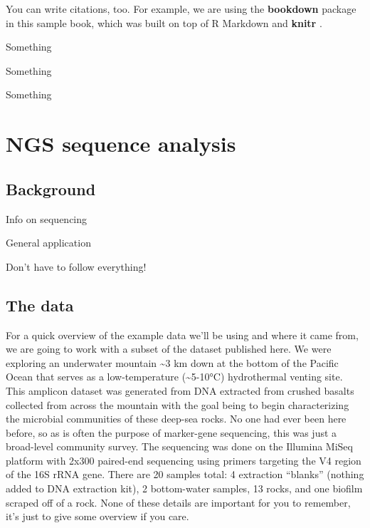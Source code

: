 \documentclass[
]{book}
\makeatletter
\newenvironment{kframe}{%
\medskip{}
\setlength{\fboxsep}{.8em}
 \def\at@end@of@kframe{}%
 \ifinner\ifhmode%
  \def\at@end@of@kframe{\end{minipage}}%
  \begin{minipage}{\columnwidth}%
 \fi\fi%
 \def\FrameCommand##1{\hskip\@totalleftmargin \hskip-\fboxsep
 \colorbox{shadecolor}{##1}\hskip-\fboxsep
     \hskip-\linewidth \hskip-\@totalleftmargin \hskip\columnwidth}%
 \MakeFramed {\advance\hsize-\width
   \@totalleftmargin\z@ \linewidth\hsize
   \@setminipage}}%
 {\par\unskip\endMakeFramed%
 \at@end@of@kframe}
\newenvironment{block}[1]
  {
  \begin{itemize}
  \renewcommand{\labelitemi}{
    \raisebox{-.7\height}[0pt][0pt]{
      {\setkeys{Gin}{width=3em,keepaspectratio}\texttt{[image: images/\#1]}}
    }
  }
  \setlength{\fboxsep}{1em}
  \begin{kframe}
  \item
  }
  {
  \end{kframe}
  \end{itemize}
  }
\newenvironment{rmdnote}
  {\begin{block}{note}}
  {\end{block}}
\newenvironment{rmdtip}
  {\begin{block}{tip}}
  {\end{block}}
\newenvironment{rmdwarning}
  {\begin{block}{warning}}
  {\end{block}}
\makeatother
\begin{document}
You can write citations, too. For example, we are using the \textbf{bookdown} package \citep{R-bookdown} in this sample book, which was built on top of R Markdown and \textbf{knitr} \citep{xie2015}.

\begin{rmdtip}
Something
\end{rmdtip}

\begin{rmdnote}
Something
\end{rmdnote}

\begin{rmdwarning}
Something
\end{rmdwarning}

\hypertarget{ngs-sequence-analysis}{%
\chapter{NGS sequence analysis}\label{ngs-sequence-analysis}}

\hypertarget{background}{%
\section{Background}\label{background}}

Info on sequencing

General application

Don't have to follow everything!

\hypertarget{the-data}{%
\section{The data}\label{the-data}}

For a quick overview of the example data we'll be using and where it came from, we are going to work with a subset of the dataset published here. We were exploring an underwater mountain \textasciitilde3 km down at the bottom of the Pacific Ocean that serves as a low-temperature (\textasciitilde5-10°C) hydrothermal venting site. This amplicon dataset was generated from DNA extracted from crushed basalts collected from across the mountain with the goal being to begin characterizing the microbial communities of these deep-sea rocks. No one had ever been here before, so as is often the purpose of marker-gene sequencing, this was just a broad-level community survey. The sequencing was done on the Illumina MiSeq platform with 2x300 paired-end sequencing using primers targeting the V4 region of the 16S rRNA gene. There are 20 samples total: 4 extraction ``blanks'' (nothing added to DNA extraction kit), 2 bottom-water samples, 13 rocks, and one biofilm scraped off of a rock. None of these details are important for you to remember, it's just to give some overview if you care.
\end{document}
